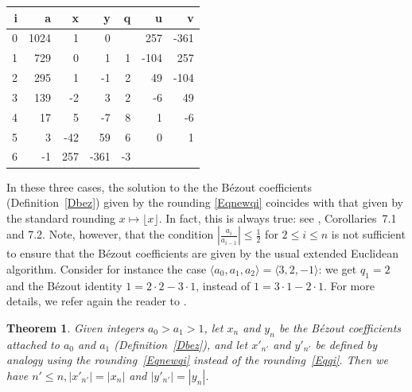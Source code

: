 \documentclass[12pt,letterpaper]{article}
\newtheorem{thm}{Theorem}%
\theoremstyle{definition}
\begin{document}
\begin{table}[H]
    \centering
    \begin{tabular}{|r|r|r|r|r|r|r|}
    \hline
    i & a  &  x &  y & q &  u &  v \\ \hline
    0 & 1024 & 1 & 0 &  & 257 & -361 \\ \hline
    1 & 729 & 0 & 1 & 1 & -104 & 257 \\ \hline
    2 & 295 & 1 & -1 & 2 & 49 & -104 \\ \hline
    3 & 139 & -2 & 3 & 2 & -6 & 49 \\ \hline
    4 & 17 & 5 & -7 & 8 & 1 & -6 \\ \hline
    5 & 3 & -42 & 59 & 6 & 0 & 1 \\ \hline
    6 & -1 & 257 & -361 & -3 &  &  \\ \hline
    \end{tabular}
\end{table}

In these three cases, the solution to the the Bézout coefficients (Definition~\ref{Dbez}) given by the  rounding \eqref{Eqnewqi} coincides with that given by the standard rounding $x\mapsto\lfloor x\rfloor$. In fact, this is always true: see \cite{gaillard_2026_euclidean}, Corollaries~7.1 and 7.2. Note, however, that the condition $|\frac{a_i}{a_{i-1}}|\le\frac{1}{2}$ for $2\le i\le n$ is not sufficient to ensure that the Bézout coefficients are given by the usual extended Euclidean algorithm. Consider for instance the case $\langle a_0,a_1,a_2\rangle=\langle 3,2,-1\rangle$: we get $q_1=2$ and the Bézout identity $1=2\cdot2-3\cdot1$, instead of $1=3\cdot1-2\cdot1$. For more details, we refer again the reader to \cite{gaillard_2026_euclidean}. %


\begin{thm}\label{Tgz}
Given integers $a_0>a_1>1$, let $x_n$ and $y_n$ be the Bézout coefficients attached to $a_0$ and $a_1$ (Definition~\ref{Dbez}), and let $x'_{n'}$ and $y'_{n'}$ be defined by analogy using the rounding~\eqref{Eqnewqi} instead of the rounding~\eqref{Eqqi}. Then we have $n'\le n, |x'_{n'}|=|x_n|$ and $|y'_{n'}|=|y_n|$. 
\end{thm}
\end{document}
